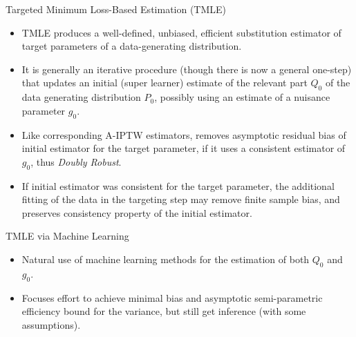 \documentclass[12pt,t,handout]{beamer}
\begin{document}
\begin{frame}[c]{Targeted Minimum Loss-Based Estimation (TMLE)}

\begin{center}
\begin{itemize}
  \item TMLE produces a well-defined, unbiased, efficient substitution estimator
    of target parameters of a data-generating distribution.
  \item It is generally an iterative procedure (though there is now a general
    one-step) that updates an initial (super learner) estimate  of the relevant
    part $Q_0$ of the data generating distribution $P_0$, possibly using an
    estimate of a nuisance parameter $g_0$.
  \item Like corresponding A-IPTW estimators, removes asymptotic residual bias
    of initial estimator for the target parameter, if it uses a consistent
    estimator of $g_0$, thus {\em Doubly Robust}.
  \item If initial estimator was consistent for the target parameter, the
    additional fitting of the data in the targeting step may remove finite
    sample bias, and  preserves consistency property of the initial estimator.
\end{itemize}
\end{center}


\end{frame}



\begin{frame}[c]{TMLE via Machine Learning}

\begin{center}
\begin{itemize}
  \item Natural use of machine learning methods for the estimation of both $Q_0$
    and $g_0$.
  \item Focuses effort to achieve minimal bias and asymptotic semi-parametric
    efficiency bound for the variance, but still get inference (with some
    assumptions).
\end{itemize}
\end{center}


\end{frame}
\end{document}

